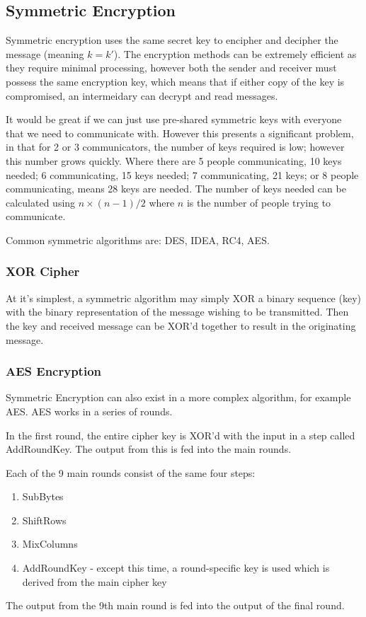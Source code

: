 \subsection{Symmetric Encryption}
Symmetric encryption uses the same secret key to encipher and decipher the message (meaning $k=k'$). The encryption methods can be extremely efficient as they require minimal processing, however both the sender and receiver must possess the same encryption key, which means that if either copy of the key is compromised, an intermeidary can decrypt and read messages.

It would be great if we can just use pre-shared symmetric keys with everyone that we need to communicate with. However this presents a significant problem, in that for 2 or 3 communicators, the number of keys required is low; however this number grows quickly. Where there are 5 people communicating, 10 keys needed; 6 communicating, 15 keys needed; 7 communicating, 21 keys; or 8 people communicating, means 28 keys are needed. The number of keys needed can be calculated using $n \times (n-1)/2$ where $n$ is the number of people trying to communicate. 

Common symmetric algorithms are: DES, IDEA, RC4, AES.

\subsubsection{XOR Cipher}
At it's simplest, a symmetric algorithm may simply XOR a binary sequence (key) with the binary representation of the message wishing to be transmitted. Then the key and received message can be XOR'd together to result in the originating message. 

\subsubsection{AES Encryption}
Symmetric Encryption can also exist in a more complex algorithm, for example AES. AES works in a series of rounds.

In the first round, the entire cipher key is XOR'd with the input in a step called AddRoundKey. The output from this is fed into the main rounds.

Each of the 9 main rounds consist of the same four steps:
\begin{enumerate}
    \item SubBytes
    \item ShiftRows
    \item MixColumns
    \item AddRoundKey - except this time, a round-specific key is used which is derived from the main cipher key
\end{enumerate}
The output from the 9th main round is fed into the output of the final round.

